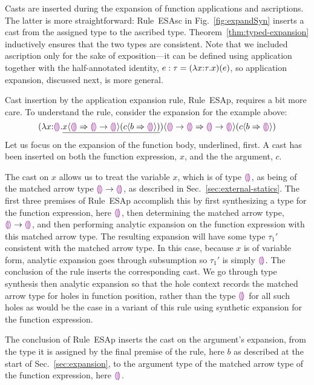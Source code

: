 Casts are inserted during the expansion of function applications and ascriptions. 
The latter is more straightforward: 
Rule~{ESAsc} in Fig.~\ref{fig:expandSyn} inserts a cast from the assigned type to the ascribed  type. 
Theorem~\ref{thm:typed-expansion} inductively ensures that the two types are consistent.  
Note that we included ascription only for the sake of exposition---it can be defined using application together with the half-annotated identity, $e : \tau = (\lambda x{:}\tau.x)(e)$, so application expansion, discussed next, is more general.

Cast insertion by the application expansion rule, Rule~{ESAp}, requires a bit more care. 
To understand the rule, consider the expansion for the example above:
\[(\lambda x{:}\textcolor{violet}{\llparenthesis}\textcolor{violet}{\rrparenthesis}.\underline{x \langle{\textcolor{violet}{\llparenthesis}\textcolor{violet}{\rrparenthesis}}\Rightarrow{\textcolor{violet}{\llparenthesis}\textcolor{violet}{\rrparenthesis}\rightarrow \textcolor{violet}{\llparenthesis}\textcolor{violet}{\rrparenthesis}}\rangle(c \langle{b}\Rightarrow{\textcolor{violet}{\llparenthesis}\textcolor{violet}{\rrparenthesis}}\rangle)}) \langle{\textcolor{violet}{\llparenthesis}\textcolor{violet}{\rrparenthesis}\rightarrow \textcolor{violet}{\llparenthesis}\textcolor{violet}{\rrparenthesis}}\Rightarrow{\textcolor{violet}{\llparenthesis}\textcolor{violet}{\rrparenthesis}\rightarrow \textcolor{violet}{\llparenthesis}\textcolor{violet}{\rrparenthesis}}\rangle(c \langle{b}\Rightarrow{\textcolor{violet}{\llparenthesis}\textcolor{violet}{\rrparenthesis}}\rangle)
\]
Let us focus on the expansion of the function body, underlined, first. 
A cast has been inserted on both the function expression, $x$, and the the argument, $c$. 

The cast on $x$ allows us to treat the variable $x$, which is of type $\textcolor{violet}{\llparenthesis}\textcolor{violet}{\rrparenthesis}$, as being of the matched arrow type $\textcolor{violet}{\llparenthesis}\textcolor{violet}{\rrparenthesis} \rightarrow \textcolor{violet}{\llparenthesis}\textcolor{violet}{\rrparenthesis}$, as described in Sec.~\ref{sec:external-statics}. 
The first three premises of Rule~{ESAp} accomplish this by first synthesizing a type for the function expression, here $\textcolor{violet}{\llparenthesis}\textcolor{violet}{\rrparenthesis}$, then determining the matched arrow type, $\textcolor{violet}{\llparenthesis}\textcolor{violet}{\rrparenthesis} \rightarrow \textcolor{violet}{\llparenthesis}\textcolor{violet}{\rrparenthesis}$, and then performing analytic expansion on the function expression with this matched arrow type.
The resulting expansion will have some type $\tau_1'$ consistent with the matched arrow type. 
In this case, because $x$ is of variable form, analytic expansion goes through subsumption so $\tau_1'$ is simply $\textcolor{violet}{\llparenthesis}\textcolor{violet}{\rrparenthesis}$. 
The conclusion of the rule inserts the corresponding cast. 
We go through type synthesis then analytic expansion so that the hole context records the matched arrow type for holes in function position, rather than the type $\textcolor{violet}{\llparenthesis}\textcolor{violet}{\rrparenthesis}$ for all such holes as would be the case in a variant of this rule using synthetic expansion for the function expression.

The conclusion of Rule~{ESAp} inserts the cast on the argument's expansion, from the type it is assigned by the final premise of the rule, here $b$ as described at the start of Sec.~\ref{sec:expansion}, to the argument type of the matched arrow type of the function expression, here $\textcolor{violet}{\llparenthesis}\textcolor{violet}{\rrparenthesis}$.

